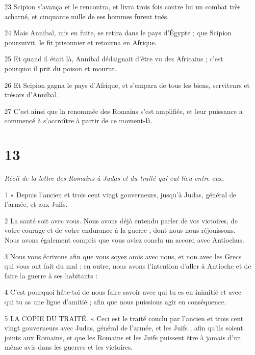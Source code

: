 \par 23 Scipion s'avança et le rencontra, et livra trois fois contre lui un combat très acharné, et cinquante mille de ses hommes furent tués.

\par 24 Mais Annibal, mis en fuite, se retira dans le pays d'Égypte ; que Scipion poursuivit, le fit prisonnier et retourna en Afrique.

\par 25 Et quand il était là, Annibal dédaignait d'être vu des Africains ; c'est pourquoi il prit du poison et mourut.

\par 26 Et Scipion gagna le pays d'Afrique, et s'empara de tous les biens, serviteurs et trésors d'Annibal.

\par 27 C'est ainsi que la renommée des Romains s'est amplifiée, et leur puissance a commencé à s'accroître à partir de ce moment-là.

\chapter{13}

\par \textit{Récit de la lettre des Romains à Judas et du traité qui eut lieu entre eux.}

\par 1 « Depuis l'ancien et trois cent vingt gouverneurs, jusqu'à Judas, général de l'armée, et aux Juifs.

\par 2 La santé soit avec vous. Nous avons déjà entendu parler de vos victoires, de votre courage et de votre endurance à la guerre ; dont nous nous réjouissons. Nous avons également compris que vous aviez conclu un accord avec Antiochus.

\par 3 Nous vous écrivons afin que vous soyez amis avec nous, et non avec les Grecs qui vous ont fait du mal : en outre, nous avons l'intention d'aller à Antioche et de faire la guerre à ses habitants :

\par 4 C'est pourquoi hâte-toi de nous faire savoir avec qui tu es en inimitié et avec qui tu as une ligue d'amitié ; afin que nous puissions agir en conséquence.

\par 5 LA COPIE DU TRAITÉ. « Ceci est le traité conclu par l'ancien et trois cent vingt gouverneurs avec Judas, général de l'armée, et les Juifs ; afin qu'ils soient joints aux Romains, et que les Romains et les Juifs puissent être à jamais d'un même avis dans les guerres et les victoires.

